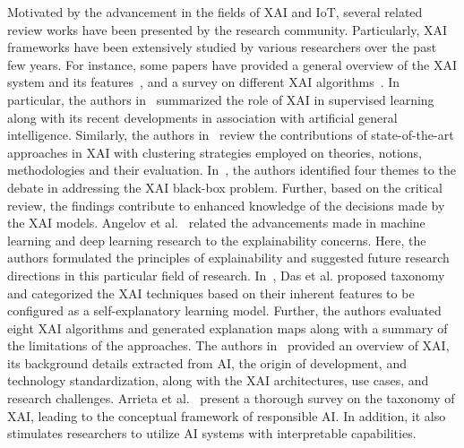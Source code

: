 \documentclass[journal]{IEEEtran}
\begin{document}
Motivated by the advancement in the fields of XAI and IoT, several related review works have been presented by the research community. Particularly, XAI frameworks have been extensively studied by various researchers over the past few years. For instance, some papers have provided a general overview of the XAI system and its features~\cite{dovsilovic2018explainable,adadi2018peeking,vilone2020explainable,arrieta2020explainable,gerlings2020reviewing,angelov2021explainable}, and a survey on different XAI algorithms~\cite{das2020opportunities}. In particular, the authors in~\cite{dovsilovic2018explainable} summarized the role of XAI in supervised learning along with its recent developments in association with artificial general intelligence. Similarly, the authors in~\cite{vilone2020explainable} review the contributions of state-of-the-art approaches in XAI with clustering strategies employed on theories, notions, methodologies and their evaluation. In~\cite{gerlings2020reviewing}, the authors identified four themes to the debate in addressing the XAI black-box problem. Further, based on the critical review, the findings contribute to enhanced knowledge of the decisions made by the XAI models. Angelov et al.~\cite{angelov2021explainable} related the advancements made in machine learning and deep learning research to the explainability concerns. Here, the authors formulated the principles of explainability and suggested future research directions in this particular field of research. In~\cite{das2020opportunities}, Das et al. proposed taxonomy and categorized the XAI techniques based on their inherent features to be configured as a self-explanatory learning model. Further, the authors evaluated eight XAI algorithms and generated explanation maps along with a summary of the limitations of the approaches. The authors in~\cite{adadi2018peeking} provided an overview of XAI, its background details extracted from AI, the origin of development, and technology standardization, along with the XAI architectures, use cases, and research challenges. Arrieta et al.~\cite{arrieta2020explainable} present a thorough survey on the taxonomy of XAI, leading to the conceptual framework of responsible AI. In addition, it also stimulates researchers to utilize AI systems with interpretable capabilities. 
\end{document}
